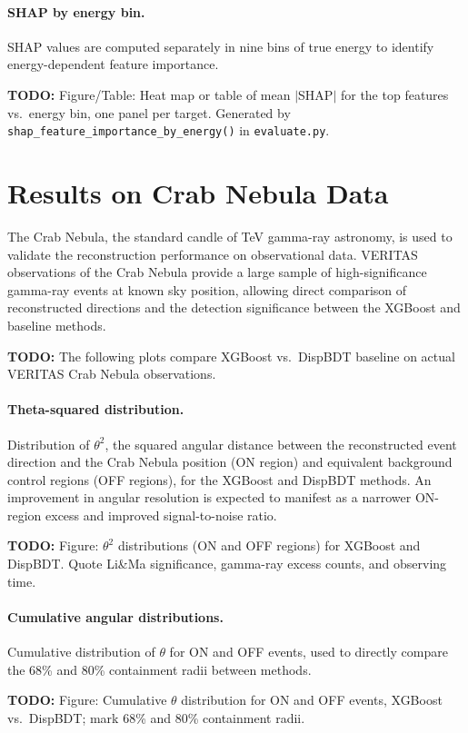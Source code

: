 \documentclass[12pt]{article}
\newcommand{\todo}[1]{\begin{hintBox} \textbf{TODO:} #1 \end{hintBox}}
\begin{document}
\paragraph{SHAP by energy bin.}
SHAP values are computed separately in nine bins of true energy to
identify energy-dependent feature importance.
\todo{Figure/Table: Heat map or table of mean $|$SHAP$|$ for the top features vs.\ energy bin, one panel per target. Generated by \texttt{shap\_feature\_importance\_by\_energy()} in \texttt{evaluate.py}.}



\section{Results on Crab Nebula Data}
\label{sec:results}

The Crab Nebula, the standard candle of TeV gamma-ray astronomy, is used to
validate the reconstruction performance on observational data.
VERITAS observations of the Crab Nebula provide a large sample of high-significance
gamma-ray events at known sky position, allowing direct comparison of reconstructed
directions and the detection significance between the XGBoost and baseline methods.

\todo{The following plots compare XGBoost vs.\ DispBDT baseline on actual VERITAS Crab Nebula observations.}

\paragraph{Theta-squared distribution.}
Distribution of $\theta^2$, the squared angular distance between the reconstructed
event direction and the Crab Nebula position (ON region) and equivalent background
control regions (OFF regions), for the XGBoost and DispBDT methods.
An improvement in angular resolution is expected to manifest as a narrower
ON-region excess and improved signal-to-noise ratio.
\todo{Figure: $\theta^2$ distributions (ON and OFF regions) for XGBoost and DispBDT. Quote Li\&Ma significance, gamma-ray excess counts, and observing time.}

\paragraph{Cumulative angular distributions.}
Cumulative distribution of $\theta$ for ON and OFF events, used to directly compare
the 68\% and 80\% containment radii between methods.
\todo{Figure: Cumulative $\theta$ distribution for ON and OFF events, XGBoost vs.\ DispBDT; mark 68\% and 80\% containment radii.}
\end{document}
